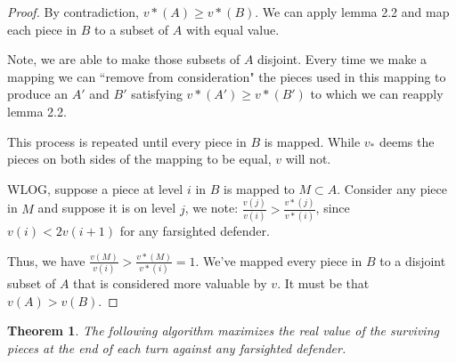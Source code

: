 \documentclass{article}
\theoremstyle{plain}
\newtheorem{thm}{Theorem}[section]
\theoremstyle{definition}
\theoremstyle{remark}
\begin{document}
\begin{proof}
	By contradiction, $v*(A) \ge v*(B)$. We can apply lemma 2.2 and map each piece in $B$ to a subset of $A$ with equal value. 
	
	Note, we are able to make those subsets of $A$ disjoint. Every time we make a mapping we can ``remove from consideration" the pieces used in this mapping to produce an $A'$ and $B'$ satisfying $v*(A') \ge v*(B')$ to which we can reapply lemma 2.2.
	
	This process is repeated until every piece in $B$ is mapped. While $v_*$ deems the pieces on both sides of the mapping to be equal, $v$ will not.
	
	WLOG, suppose a piece at level $i$ in $B$ is mapped to $M \subset A$. 
    Consider any piece in $M$ and suppose it is on level $j$, we note: $\frac{v(j)}{v(i)} > \frac{v*(j)}{v*(i)}$, since $v(i) < 2v(i+1)$ for any farsighted defender.
    
    Thus, we have $\frac{v(M)}{v(i)} > \frac{v*(M)}{v*(i)} = 1$. We've mapped every piece in $B$ to a disjoint subset of $A$ that is considered more valuable by $v$. It must be that $v(A) > v(B)$.
\end{proof}

\begin{thm}
	The following algorithm maximizes the real value of the surviving pieces at the end of each turn against any farsighted defender.
\end{thm}
\end{document}

